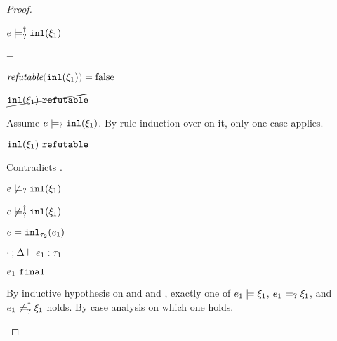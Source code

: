\begin{proof}
\begin{byCases}
\begin{byCases}
\begin{byCases}
\begin{pfsteps*}
            \item $e \models_{?}^{\dag} \mathtt{inl}(\xi_1)$ 
            \end{pfsteps*}
        \item[\frefutable{\cinl{\xi_1}}=\false]
            \begin{pfsteps*}
            \item $\frefutable{\cinl{\xi_1}}=\false$  
            \item $\cancel{\mathtt{inl}(\xi_1) ~\mathtt{refutable}}$  
            \end{pfsteps*}
            Assume $e \models_{?} \mathtt{inl}(\xi_1)$. By rule induction over  on it, only one case applies.
            \begin{byCases}
            \item[\text{(\ref{rule:CMSNotVal})}]
                \begin{pfsteps*}
                \item $\mathtt{inl}(\xi_1) ~\mathtt{refutable}$ 
                \end{pfsteps*}
                Contradicts .
            \end{byCases}
            \begin{pfsteps*}
            \item $e \not\models_{?} \mathtt{inl}(\xi_1)$  
            \item $e \not\models_{?}^{\dag} \mathtt{inl}(\xi_1)$ 
            \end{pfsteps*}
        \end{byCases}
    \item[\text{(\ref{rule:TInl})}]
        \begin{pfsteps*}
        \item $e=\mathtt{inl}_{\tau_2}({e_1})$ 
        \item $\cdot \mathbin{;} \Delta \vdash e_1 : \tau_1$  
        \item $e_1 ~\mathtt{final}$  
        \end{pfsteps*}
        By inductive hypothesis on  and  and , exactly one of $e_1 \models \xi_1$, $e_1 \models_{?} \xi_1$, and $e_1 \not\models_{?}^{\dag} \xi_1$ holds. By case analysis on which one holds.

\end{byCases}
\end{byCases}
\end{proof}
